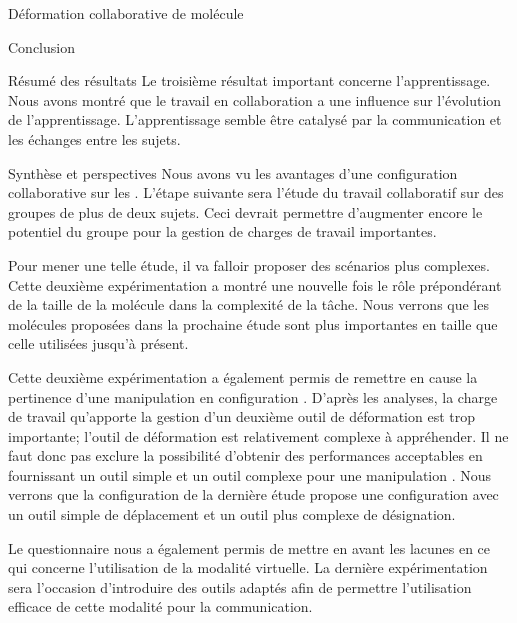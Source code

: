 \documentclass[myfrancais,ngerman,english,frenchb]{mythesis}
\begin{document}
\begin{mychapter}{Déformation collaborative de molécule}
\begin{mysection}{Conclusion}
\begin{mysubsection}{Résumé des résultats}
				Le troisième résultat important concerne l'apprentissage.
				Nous avons montré que le travail en collaboration a une influence sur l'évolution de l'apprentissage.
				L'apprentissage semble être catalysé par la communication et les échanges entre les sujets.
			\end{mysubsection}
			\begin{mysubsection}{Synthèse et perspectives}
				Nous avons vu les avantages d'une configuration collaborative sur les .
				L'étape suivante sera l'étude du travail collaboratif sur des groupes de plus de deux sujets.
				Ceci devrait permettre d'augmenter encore le potentiel du groupe pour la gestion de charges de travail importantes.

				Pour mener une telle étude, il va falloir proposer des scénarios plus complexes.
				Cette deuxième expérimentation a montré une nouvelle fois le rôle prépondérant de la taille de la molécule dans la complexité de la tâche.
				Nous verrons que les molécules proposées dans la prochaine étude sont plus importantes en taille que celle utilisées jusqu'à présent.

				Cette deuxième expérimentation a également permis de remettre en cause la pertinence d'une manipulation en configuration .
				D'après les analyses, la charge de travail qu'apporte la gestion d'un deuxième outil de déformation est trop importante; l'outil de déformation est relativement complexe à appréhender.
				Il ne faut donc pas exclure la possibilité d'obtenir des performances acceptables en fournissant un outil simple et un outil complexe pour une manipulation .
				Nous verrons que la configuration de la dernière étude  propose une configuration  avec un outil simple de déplacement et un outil plus complexe de désignation.

				Le questionnaire nous a également permis de mettre en avant les lacunes en ce qui concerne l'utilisation de la modalité virtuelle.
				La dernière expérimentation sera l'occasion d'introduire des outils adaptés afin de permettre l'utilisation efficace de cette modalité pour la communication.
			\end{mysubsection}
		\end{mysection}
	\end{mychapter}
\end{document}
